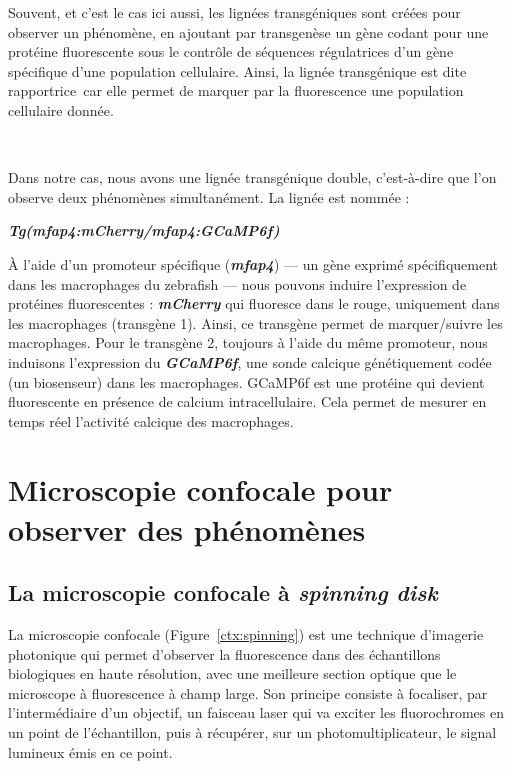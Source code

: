 \documentclass[a4paper,12pt]{report}
\newcommand{\figref}[1]{Figure~\ref{#1}}
\begin{document}
Souvent, et c'est le cas ici aussi, les lignées transgéniques sont créées pour observer un phénomène, en ajoutant par transgenèse un gène codant pour une protéine fluorescente sous le contrôle de séquences régulatrices d'un gène spécifique d'une population cellulaire. Ainsi, la lignée transgénique est dite \og rapportrice\fg\ car elle permet de marquer par la fluorescence une population cellulaire donnée.

\

Dans notre cas, nous avons une lignée transgénique double, c'est-à-dire que l'on observe deux phénomènes simultanément. La lignée est nommée :

\begin{center}
    \large \textbf{\textit{Tg(mfap4:mCherry/mfap4:GCaMP6f)}}
\end{center}

À l'aide d'un promoteur spécifique (\textbf{\textit{mfap4}}) --- un gène exprimé spécifiquement dans les macrophages du zebrafish --- nous pouvons induire l'expression de protéines fluorescentes : \textbf{\textit{mCherry}} qui fluoresce dans le rouge, uniquement dans les macrophages (transgène 1). Ainsi, ce transgène permet de marquer/suivre les macrophages. Pour le transgène 2, toujours à l'aide du même promoteur, nous induisons l'expression du \textbf{\textit{GCaMP6f}}, une sonde calcique génétiquement codée (un biosenseur) dans les macrophages. GCaMP6f est une protéine qui devient fluorescente en présence de calcium intracellulaire. Cela permet de mesurer en temps réel l'activité calcique des macrophages.


\section{Microscopie confocale pour observer des phénomènes}\label{micro}
\subsection{La microscopie confocale à \textit{spinning disk}}
La microscopie confocale (\figref{ctx:spinning}) est une technique d'imagerie photonique qui permet d'observer la fluorescence dans des échantillons biologiques en haute résolution, avec une meilleure section optique que le microscope à fluorescence à champ large. Son principe consiste à focaliser, par l'intermédiaire d'un objectif, un faisceau laser qui va exciter les fluorochromes en un point de l'échantillon, puis à récupérer, sur un photomultiplicateur, le signal lumineux émis en ce point.
\end{document}
